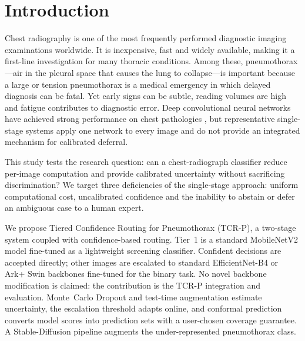 \documentclass[pdflatex,sn-nature]{sn-jnl}
\begin{document}

\maketitle

\section{Introduction}\label{sec:intro}

Chest radiography is one of the most frequently performed diagnostic imaging examinations worldwide. It is inexpensive, fast and widely available, making it a first-line investigation for many thoracic conditions. Among these, pneumothorax---air in the pleural space that causes the lung to collapse---is important because a large or tension pneumothorax is a medical emergency in which delayed diagnosis can be fatal. Yet early signs can be subtle, reading volumes are high and fatigue contributes to diagnostic error. Deep convolutional neural networks have achieved strong performance on chest pathologies \cite{rajpurkar2018chexnext, irvin2019chexpert}, but representative single-stage systems apply one network to every image and do not provide an integrated mechanism for calibrated deferral.

This study tests the research question: can a chest-radiograph classifier reduce per-image computation and provide calibrated uncertainty without sacrificing discrimination? We target three deficiencies of the single-stage approach: uniform computational cost, uncalibrated confidence and the inability to abstain or defer an ambiguous case to a human expert.

We propose Tiered Confidence Routing for Pneumothorax (TCR-P), a two-stage system coupled with confidence-based routing. Tier~1 is a standard MobileNetV2 model \cite{sandler2018mobilenetv2} fine-tuned as a lightweight screening classifier. Confident decisions are accepted directly; other images are escalated to standard EfficientNet-B4 \cite{tan2019efficientnet} or Ark+ Swin \cite{ma2025arkplus, liu2021swin} backbones fine-tuned for the binary task. No novel backbone modification is claimed: the contribution is the TCR-P integration and evaluation. Monte~Carlo Dropout \cite{gal2016dropout} and test-time augmentation estimate uncertainty, the escalation threshold adapts online, and conformal prediction \cite{vovk2005algorithmic, shafer2008tutorial} converts model scores into prediction sets with a user-chosen coverage guarantee. A Stable-Diffusion \cite{rombach2022high} pipeline augments the under-represented pneumothorax class.
\end{document}
